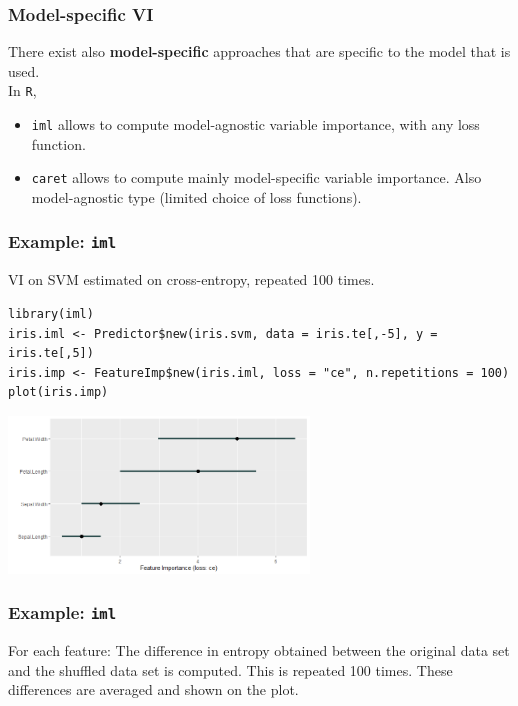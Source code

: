 \begin{frame}
\frametitle{Model-specific VI}
There exist also {\bf model-specific} approaches that are specific to the model that is used. \\
\vspace{0.2cm}
In {\tt R}, 
\begin{itemize}
\item {\tt iml} allows to compute model-agnostic variable importance, with any loss function.
\item {\tt caret} allows to compute mainly model-specific variable importance. Also model-agnostic type (limited choice of loss functions).
\end{itemize}
\end{frame}
\begin{frame}[fragile]
\frametitle{Example: {\tt iml}}
VI on SVM estimated on cross-entropy, repeated 100 times.
\scriptsize
\begin{verbatim}
library(iml)
iris.iml <- Predictor$new(iris.svm, data = iris.te[,-5], y = iris.te[,5])
iris.imp <- FeatureImp$new(iris.iml, loss = "ce", n.repetitions = 100)
plot(iris.imp)
\end{verbatim}
\normalsize
\begin{center}
\includegraphics[width=8cm]{../Graphs/VarImp_iml_ce_svm.png}
\end{center}
\end{frame}
\begin{frame}
\frametitle{Example: {\tt iml}}
For each feature: The difference in entropy obtained between the original data set and the shuffled data set is computed. This is repeated 100 times. These differences are averaged and shown on the plot.
\end{frame}
